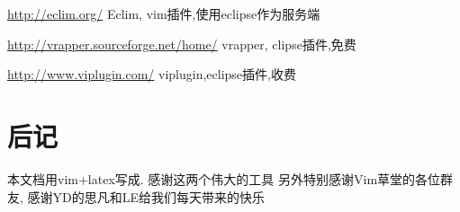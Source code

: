 \documentclass[oneside,openany]{book}
\begin{document}
  \href{http://eclim.org/}{http://eclim.org/} Eclim, vim插件,使用eclipse作为服务端
  \newline

  \href{http://vrapper.sourceforge.net/home/}{http://vrapper.sourceforge.net/home/}
  vrapper, clipse插件,免费
  \newline

  \href{http://www.viplugin.com/}{http://www.viplugin.com/}
  viplugin,eclipse插件,收费
  \newline

\chapter{后记}
    本文档用vim+latex写成. 感谢这两个伟大的工具
   \newline
   另外特别感谢Vim草堂的各位群友, 感谢YD的思凡和LE给我们每天带来的快乐
   
   
\end{document}
